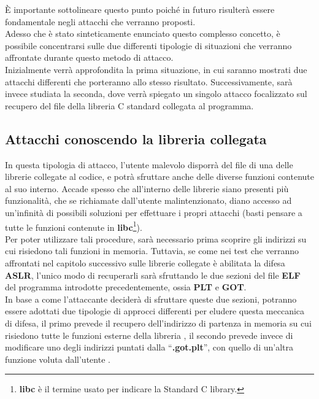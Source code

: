 È importante sottolineare questo punto poiché in futuro risulterà essere fondamentale negli attacchi che verranno proposti.\\
Adesso che è stato sinteticamente enunciato questo complesso concetto, è possibile concentrarsi sulle due differenti tipologie di situazioni che verranno affrontate durante questo metodo di attacco.\\
Inizialmente verrà approfondita la prima situazione, in cui saranno mostrati due attacchi differenti che porteranno allo stesso risultato.
Successivamente, sarà invece studiata la seconda, dove verrà spiegato un singolo attacco focalizzato sul recupero del file della libreria C standard collegata al programma.

\subsection{Attacchi conoscendo la libreria collegata}
\label{subsec:Attack_3.2}
In questa tipologia di attacco, l'utente malevolo disporrà del file di una delle librerie collegate al codice, e potrà sfruttare anche delle diverse funzioni contenute al suo interno. Accade spesso che all'interno delle librerie siano presenti più funzionalità,
che se richiamate dall'utente malintenzionato, diano accesso ad un'infinità di possibili soluzioni per effettuare i propri attacchi (basti pensare a tutte le funzioni contenute in \textbf{libc}\footnote[1]{\textbf{libc} è il termine usato per indicare la Standard C library.}).\\
Per poter utilizzare tali procedure, sarà necessario prima scoprire gli indirizzi su cui risiedono tali funzioni in memoria. Tuttavia, se come nei test che verranno affrontati nel capitolo successivo sulle librerie collegate è abilitata la difesa \textbf{ASLR}, l'unico modo di recuperarli sarà sfruttando le due sezioni del file \textbf{ELF} del programma introdotte precedentemente, ossia \textbf{PLT} e \textbf{GOT}.\\
In base a come l'attaccante deciderà di sfruttare queste due sezioni, potranno essere adottati due tipologie di approcci differenti per eludere questa meccanica di difesa, il primo prevede il recupero dell'indirizzo di partenza in memoria su cui risiedono tutte le funzioni esterne della libreria \cite*{Return2plt}, il secondo prevede invece di modificare uno degli indirizzi puntati dalla ``\textbf{.got.plt}'', con quello di un'altra funzione voluta dall'utente \cite*{PLT-GOT-OVERWRITE}.

